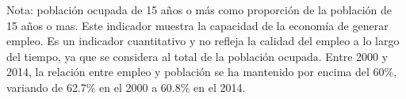 Nota: población ocupada de 15 años o más como proporción de la población de 15 años o mas. Este indicador muestra la capacidad de la economía de generar empleo. Es un indicador cuantitativo y no refleja la calidad del empleo a lo largo del tiempo, ya que se considera al total de la población ocupada.  Entre 2000 y 2014, la relación entre empleo y población se ha mantenido por encima del 60\%, variando de 62.7\% en el 2000 a 60.8\% en el 2014.